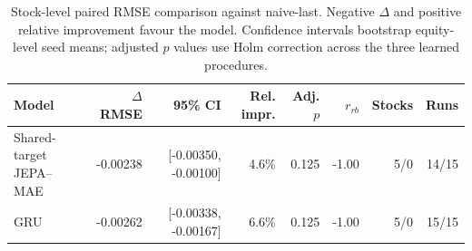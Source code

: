 \begin{table}[t]
\centering
\small
\caption{Stock-level paired RMSE comparison against naive-last. Negative $\Delta$ and positive relative improvement favour the model. Confidence intervals bootstrap equity-level seed means; adjusted $p$ values use Holm correction across the three learned procedures.}
\label{tab:paired_rmse_naive}
\begin{tabular}{lrrrrrrr}
\toprule
Model & $\Delta$RMSE & 95\% CI & Rel. impr. & Adj. $p$ & $r_{rb}$ & Stocks & Runs \\
\midrule
Shared-target JEPA--MAE & -0.00238 & [-0.00350, -0.00100] & 4.6\% & 0.125 & -1.00 & 5/0 & 14/15 \\
GRU & -0.00262 & [-0.00338, -0.00167] & 6.6\% & 0.125 & -1.00 & 5/0 & 15/15 \\
\bottomrule
\end{tabular}
\end{table}
